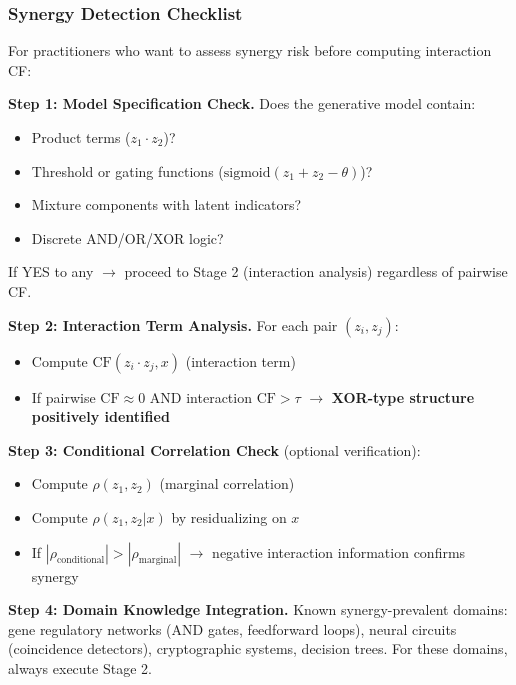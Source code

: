 \documentclass[10pt]{article} %
\theoremstyle{plain}
\theoremstyle{definition}
\newcommand{\CF}{\mathrm{CF}}
\begin{document}
\subsubsection{Synergy Detection Checklist}

For practitioners who want to assess synergy risk before computing interaction CF:

\begin{tcolorbox}[breakable, colback=gray!10, colframe=black, title=\textbf{Synergy Detection Protocol (Detailed)}, fonttitle=\bfseries]
\textbf{Step 1: Model Specification Check.} Does the generative model contain:
\begin{itemize}
    \item Product terms ($z_1 \cdot z_2$)?
    \item Threshold or gating functions ($\text{sigmoid}(z_1 + z_2 - \theta)$)?
    \item Mixture components with latent indicators?
    \item Discrete AND/OR/XOR logic?
\end{itemize}
If YES to any $\rightarrow$ proceed to Stage 2 (interaction analysis) regardless of pairwise CF.

\textbf{Step 2: Interaction Term Analysis.} For each pair $(z_i, z_j)$:
\begin{itemize}
    \item Compute $\CF(z_i \cdot z_j, x)$ (interaction term)
    \item If pairwise $\CF \approx 0$ AND interaction $\CF > \tau$ $\rightarrow$ \textbf{XOR-type structure positively identified}
\end{itemize}

\textbf{Step 3: Conditional Correlation Check} (optional verification):
\begin{itemize}
    \item Compute $\rho(z_1, z_2)$ (marginal correlation)
    \item Compute $\rho(z_1, z_2 | x)$ by residualizing on $x$
    \item If $|\rho_{\text{conditional}}| > |\rho_{\text{marginal}}|$ $\rightarrow$ negative interaction information confirms synergy
\end{itemize}

\textbf{Step 4: Domain Knowledge Integration.}
Known synergy-prevalent domains: gene regulatory networks (AND gates, feedforward loops), neural circuits (coincidence detectors), cryptographic systems, decision trees. For these domains, always execute Stage 2.
\end{tcolorbox}
\end{document}
